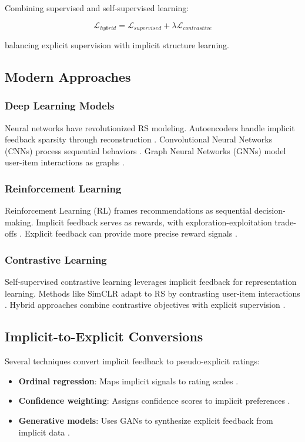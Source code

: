 Combining supervised and self-supervised learning:

\begin{equation}
\mathcal{L}_{hybrid} = \mathcal{L}_{supervised} + \lambda \mathcal{L}_{contrastive}
\label{eq:hybrid_contrastive}
\end{equation}

balancing explicit supervision with implicit structure learning.

\subsection{Modern Approaches}

\subsubsection{Deep Learning Models}
Neural networks have revolutionized RS modeling. Autoencoders handle implicit feedback sparsity through reconstruction \cite{sedhain2015autorec}. Convolutional Neural Networks (CNNs) process sequential behaviors \cite{tang2018personalized}. Graph Neural Networks (GNNs) model user-item interactions as graphs \cite{wang2019neural}.

\subsubsection{Reinforcement Learning}
Reinforcement Learning (RL) frames recommendations as sequential decision-making. Implicit feedback serves as rewards, with exploration-exploitation trade-offs \cite{zhao2018recommendations}. Explicit feedback can provide more precise reward signals \cite{chen2019large}.

\subsubsection{Contrastive Learning}
Self-supervised contrastive learning leverages implicit feedback for representation learning. Methods like SimCLR adapt to RS by contrasting user-item interactions \cite{wu2021self}. Hybrid approaches combine contrastive objectives with explicit supervision \cite{xie2022contrastive}.

\subsection{Implicit-to-Explicit Conversions}

Several techniques convert implicit feedback to pseudo-explicit ratings:
\begin{itemize}
    \item \textbf{Ordinal regression}: Maps implicit signals to rating scales \cite{weston2011wsabie}.
    \item \textbf{Confidence weighting}: Assigns confidence scores to implicit preferences \cite{he2016fast}.
    \item \textbf{Generative models}: Uses GANs to synthesize explicit feedback from implicit data \cite{wang2017irgan}.
\end{itemize}

